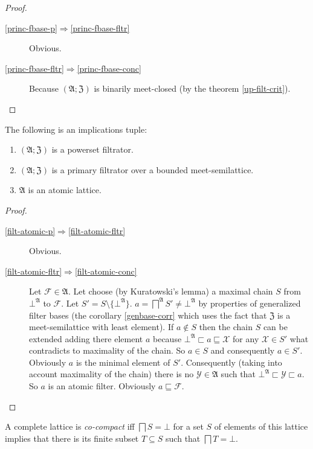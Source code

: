\begin{proof}
~
\begin{description}
\item [{\ref{princ-fbase-p}$\Rightarrow$\ref{princ-fbase-fltr}}] Obvious.
\item [{\ref{princ-fbase-fltr}$\Rightarrow$\ref{princ-fbase-conc}}] Because
$(\mathfrak{A};\mathfrak{Z})$ is binarily meet-closed (by the theorem
\ref{up-filt-crit}).
\end{description}
\end{proof}
\begin{thm}
\label{filt-atomic}The following is an implications tuple:
\begin{enumerate}
\item \label{filt-atomic-p}$(\mathfrak{A};\mathfrak{Z})$ is a powerset
filtrator.
\item \label{filt-atomic-fltr}$(\mathfrak{A};\mathfrak{Z})$ is a primary
filtrator over a bounded meet-semilattice.
\item \label{filt-atomic-conc}$\mathfrak{A}$ is an atomic lattice.
\end{enumerate}
\end{thm}
\begin{proof}
~
\begin{description}
\item [{\ref{filt-atomic-p}$\Rightarrow$\ref{filt-atomic-fltr}}] Obvious.
\item [{\ref{filt-atomic-fltr}$\Rightarrow$\ref{filt-atomic-conc}}] Let
$\mathcal{F}\in\mathfrak{A}$. Let choose (by Kuratowski's lemma)
a maximal chain $S$ from $\bot^{\mathfrak{A}}$ to $\mathcal{F}$.
Let $S'=S\setminus\{\bot^{\mathfrak{A}}\}$. $a=\bigsqcap^{\mathfrak{A}}S'\ne\bot^{\mathfrak{A}}$
by properties of generalized filter bases (the corollary \ref{genbase-corr}
which uses the fact that $\mathfrak{Z}$ is a meet-semilattice with
least element). If $a\notin S$ then the chain $S$ can be extended
adding there element $a$ because $\bot^{\mathfrak{A}}\sqsubset a\sqsubseteq\mathcal{X}$
for any $\mathcal{X}\in S'$ what contradicts to maximality of the
chain. So $a\in S$ and consequently $a\in S'$. Obviously $a$ is
the minimal element of $S'$. Consequently (taking into account maximality
of the chain) there is no $\mathcal{Y}\in\mathfrak{A}$ such that
$\bot^{\mathfrak{A}}\sqsubset\mathcal{Y}\sqsubset a$. So $a$ is
an atomic filter. Obviously $a\sqsubseteq\mathcal{F}$.
\end{description}
\end{proof}
\begin{defn}
A complete lattice is \emph{co-compact} iff $\bigsqcap S=\bot$ for
a set $S$ of elements of this lattice implies that there is its finite
subset $T\subseteq S$ such that $\bigsqcap T=\bot$.\end{defn}
